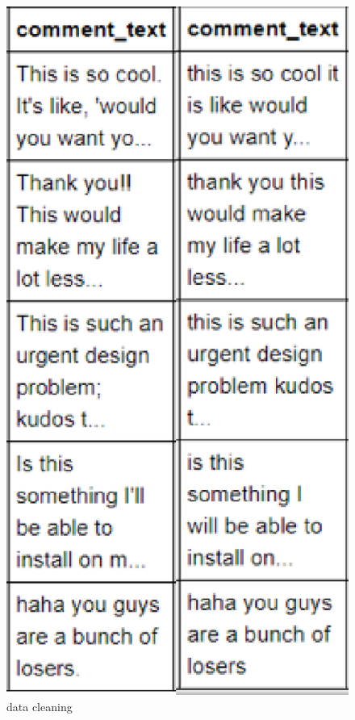 \documentclass{amsart}
\begin{document}
\begin{figure}[h]
  \includegraphics[scale=0.5]{picture/result.eps}
  \caption{data cleaning}\label{fig:1}
\end{figure}
\end{document}
